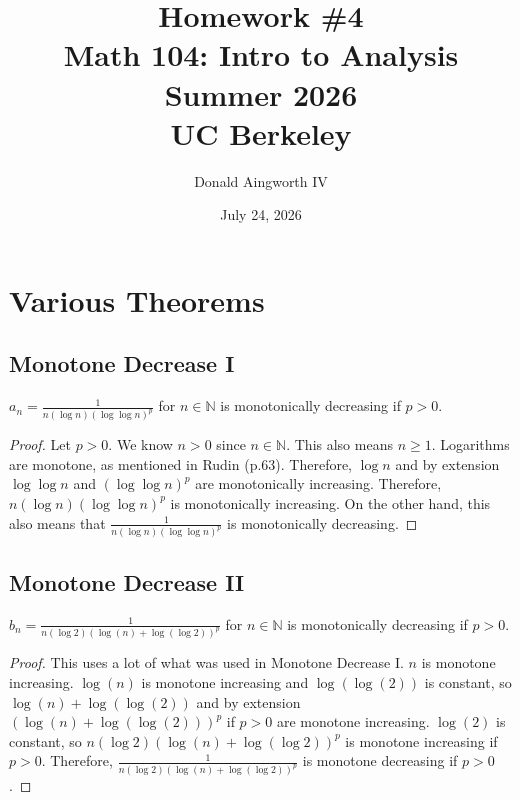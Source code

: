 \documentclass[11pt]{article}
\title{Homework \#4\\{\large Math 104: Intro to Analysis \\ Summer 2026} \\ {\normalsize UC Berkeley}}
\date{July 24, 2026}
\author{Donald Aingworth IV}
\begin{document}
\renewcommand\qedsymbol{OE$\Delta$}
\newcommand{\abs}[1]{\left| #1 \right|}
\newcommand{\andtxt}{\text{ and }}
\newcommand{\Ais}{\ensuremath{\overset{A}{=}}}
\newcommand{\Cis}{\ensuremath{\overset{C}{=}}}
\newcommand{\closure}[1]{\ensuremath{\overline{#1}}}
\newcommand{\encircle}[1]{%
  \tikz[baseline=(char.base)]{%
    \node[shape=circle, draw, inner sep=1pt] (char) {#1};%
  }%
}
\newcommand{\mathif}{\text{if }}
\newcommand{\seq}[2][n]{\ensuremath{\left\{ #2 _{#1} \right\}}}
\newcommand{\zz}[1]{$\mathbb{Z}/ #1 \mathbb{Z}$}

\maketitle

\tableofcontents

\pagebreak
\setcounter{section}{-1}
\section{Various Theorems}
    \subsection{Monotone Decrease I}
        $a_n = \frac{1}{n(\log n)(\log \log n)^p}$ for $n \in \mathbb{N}$ is monotonically decreasing if $p > 0$.
        \begin{proof}
            Let $p > 0$.
            We know $n > 0$ since $n \in \mathbb{N}$.
            This also means $n \geq 1$.
            Logarithms are monotone, as mentioned in Rudin (p.63).
            Therefore, $\log n$ and by extension $\log \log n$ and $(\log \log n)^p$ are monotonically increasing.
            Therefore, $n (\log n) (\log \log n)^p$ is monotonically increasing.
            On the other hand, this also means that $\frac{1}{n (\log n) (\log \log n)^p}$ is monotonically decreasing.
        \end{proof}

    \subsection{Monotone Decrease II}
        $b_n = \frac{1}{n (\log 2) (\log (n) + \log (\log 2))^p}$ for $n \in \mathbb{N}$ is monotonically decreasing if $p > 0$.
        \begin{proof}
            This uses a lot of what was used in Monotone Decrease I.
            $n$ is monotone increasing.
            $\log(n)$ is monotone increasing and $\log(\log(2))$ is constant, so $\log(n) + \log(\log(2))$ and by extension $(\log(n) + \log(\log(2)))^p$ if $p > 0$ are monotone increasing.
            $\log(2)$ is constant, so $n (\log 2) (\log (n) + \log (\log 2))^p$ is monotone increasing if $p > 0$.
            Therefore, $\frac{1}{n (\log 2) (\log (n) + \log (\log 2))^p}$ is monotone decreasing if $p > 0$.
        \end{proof}
\end{document}
